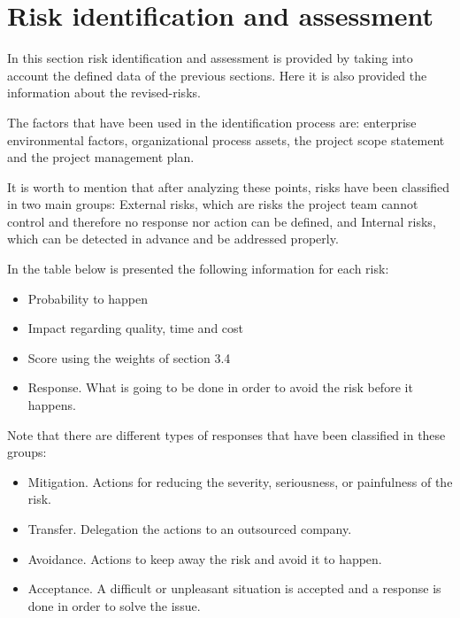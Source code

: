 \section{Risk identification and assessment}

In this section risk identification and assessment is provided by taking into account the defined data of the previous sections. Here it is also provided the information about the revised-risks. 

The factors that have been used in the identification process are: enterprise environmental factors, organizational process assets, the project scope statement and the project management plan.

It is worth to mention that after analyzing these points, risks have been classified in two main groups: External risks, which are risks the project team cannot control and therefore no response nor action can be defined, and Internal risks, which can be detected in advance and be addressed properly.

In the table below is presented the following information for each risk:

\begin{itemize}
	\item Probability to happen
	\item Impact regarding quality, time and cost
	\item Score using the weights of section 3.4
	\item Response. What is going to be done in order to avoid the risk before it happens.
\end{itemize}

Note that there are different types of responses that have been classified in these groups:

\begin{itemize}
	\item Mitigation. Actions for reducing the severity, seriousness, or painfulness of the risk.
	\item Transfer. Delegation the actions to an outsourced company.
	\item Avoidance. Actions to keep away the risk and avoid it to happen.
	\item Acceptance. A difficult or unpleasant situation is accepted and a response is done in order to solve the issue.
\end{itemize}

